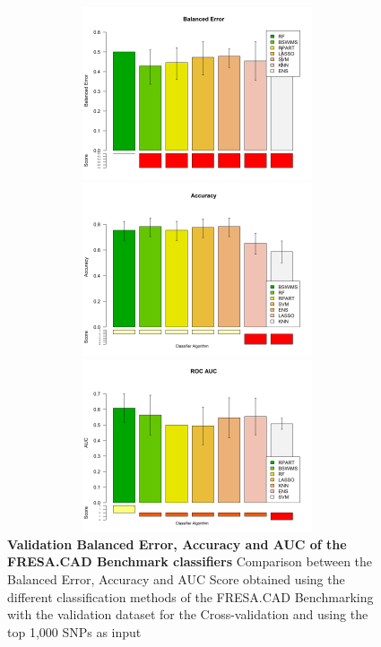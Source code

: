  \begin{figure}[!ht]
\centerline{\includegraphics[width=5in,height=2in]{images/results/fresaBEVal.png}}
\centerline{\includegraphics[width=5in,height=2in]{images/results/fresaAccVal.png}}
\centerline{\includegraphics[width=5in,height=2in]{images/results/fresaAUCVal.png}}
\caption{{\bf Validation Balanced Error, Accuracy and AUC of the FRESA.CAD Benchmark classifiers} 
Comparison between the Balanced Error, Accuracy and AUC Score obtained using the different classification methods of the FRESA.CAD Benchmarking with the validation dataset for the Cross-validation and using the top 1,000 SNPs as input}
\label{fig26}
\end{figure}

